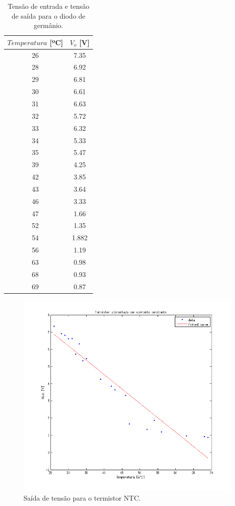 \begin{small}
	\begin{table}[H]
		\begin{center}
			\caption{Tensão de entrada e tensão de saída para o diodo de germânio.}
			\begin{tabular}{c|c}
				\hline
				$Temperatura$ [ºC] & $V_o$ [V] \\
				\hline
				26 & 7.35 \\
				\hline
				28 & 6.92 \\
				\hline
				29 & 6.81 \\
				\hline
				30 & 6.61 \\
				\hline
				31 & 6.63 \\
				\hline
				32 & 5.72 \\
				\hline
				33 & 6.32 \\
				\hline
				34 & 5.33 \\
				\hline
				35 & 5.47 \\
				\hline
				39 & 4.25 \\
				\hline
				42 & 3.85 \\
				\hline
				43 & 3.64 \\
				\hline
				46 & 3.33 \\
				\hline
				47 & 1.66 \\
				\hline
				52 & 1.35 \\
				\hline
				54 & 1.882 \\
				\hline
				56 & 1.19 \\
				\hline
				63 & 0.98 \\
				\hline
				68 & 0.93 \\
				\hline
				69 & 0.87 \\
				\hline
			\end{tabular}
			\label{t_termistor}
		\end{center}
	\end{table}
\end{small}

\begin{figure}[H]
	\centering
	\includegraphics[scale=0.9]{img/plottermistor.png}
	\caption{Saída de tensão para o termistor NTC.}
	\label{f_plottermistor}
\end{figure}